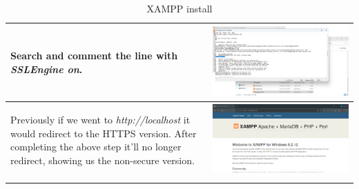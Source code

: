 \documentclass[11pt,a4paper]{report}
\begin{document}
\begin{flushleft}
\begin{center}
\begin{longtable}{ m{5cm} l }
                        \hline
                        Search and comment the line with \textit{SSLEngine on}.
                        & \includegraphics[scale=0.285,valign=c]{install_xampp16} \\
                        \hline
                        \begin{flushleft}
                            Previously if we went to \textit{http://localhost} it would redirect to the HTTPS version. After completing the above step it'll no longer redirect, showing us the non-secure version.
                        \end{flushleft}
                        & \includegraphics[scale=0.285,valign=c]{install_xampp17} \\
                        \hline

                        \caption{XAMPP install} \label{tab:xampp}
                    \end{longtable}
                \end{center}


\end{flushleft}
\end{document}
